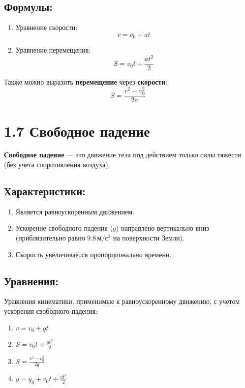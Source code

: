 \documentclass[a4paper,12pt]{article}
\begin{document}
\subsection*{Формулы:}
\vspace{-3pt}
\begin{enumerate} [itemsep=0pt, topsep=0pt, parsep=3pt]
  \item Уравнение скорости:
    \vspace{-0.05em}
    $$ v = v_0 + at $$ 
  \item Уравнение перемещения:
    \vspace{-0.05em}
    $$ S = v_0 t + \frac{at^2}{2} $$ 
\end{enumerate}
Также можно выразить \textbf{перемещение} через \textbf{скорости}:
\vspace{-0.05em}
\[
S = \frac{v^2 - v_0^2}{2a}
\]


\section*{1.7 Свободное падение}

\vspace{-9pt}
\textbf{Свободное падение} — это движение тела под действием только силы тяжести (без учета сопротивления воздуха).
\vspace{-9pt}
\subsection*{Характеристики:}
\vspace{-3pt}
\begin{enumerate} [itemsep=0pt, topsep=0pt, parsep=3pt]
  \item Является равноускоренным движением.
  \item Ускорение свободного падения ($g$) направлено вертикально вниз (приблизительно равно $9.8 \, м/с^2$ на поверхности Земли).
  \item Скорость увеличивается пропорционально времени.
\end{enumerate}
\vspace{-9pt}
\subsection*{Уравнения:}
\vspace{-3pt}
Уравнения кинематики, применимые к равноускоренному движению, с учетом ускорения свободного падения:
\begin{enumerate} [itemsep=0pt, topsep=0pt, parsep=3pt]
  \item $v = v_0 + gt$
  \item $S = v_0 t + \frac{gt^2}{2}$
  \item $S = \frac{v^2 - v_0^2}{2g}$
  \item $y = y_0 + v_0 t + \frac{at^2}{2}$
\end{enumerate}
\end{document}
